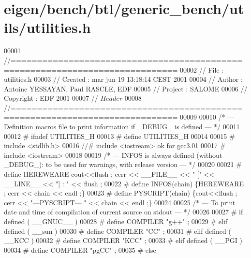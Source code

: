 \hypertarget{eigen_2bench_2btl_2generic__bench_2utils_2utilities_8h_source}{}\section{eigen/bench/btl/generic\+\_\+bench/utils/utilities.h}
\label{eigen_2bench_2btl_2generic__bench_2utils_2utilities_8h_source}

\begin{DoxyCode}
00001 \textcolor{comment}{//=============================================================================}
00002 \textcolor{comment}{// File      : utilities.h}
00003 \textcolor{comment}{// Created   : mar jun 19 13:18:14 CEST 2001}
00004 \textcolor{comment}{// Author    : Antoine YESSAYAN, Paul RASCLE, EDF}
00005 \textcolor{comment}{// Project   : SALOME}
00006 \textcolor{comment}{// Copyright : EDF 2001}
00007 \textcolor{comment}{// $Header$}
00008 \textcolor{comment}{//=============================================================================}
00009 
00010 \textcolor{comment}{/* ---  Definition macros file to print information if \_DEBUG\_ is defined --- */}
00011 
00012 \textcolor{preprocessor}{# ifndef UTILITIES\_H}
00013 \textcolor{preprocessor}{# define UTILITIES\_H}
00014 
00015 \textcolor{preprocessor}{# include <stdlib.h>}
00016 \textcolor{comment}{//# include <iostream> ok for gcc3.01}
00017 \textcolor{preprocessor}{# include <iostream>}
00018 
00019 \textcolor{comment}{/* ---  INFOS is always defined (without \_DEBUG\_): to be used for warnings, with release version --- */}
00020 
00021 \textcolor{preprocessor}{# define HEREWEARE cout<<flush ; cerr << \_\_FILE\_\_ << " [" << \_\_LINE\_\_ << "] : " << flush ;}
00022 \textcolor{preprocessor}{# define INFOS(chain) \{HEREWEARE ; cerr << chain << endl ;\}}
00023 \textcolor{preprocessor}{# define PYSCRIPT(chain) \{cout<<flush ; cerr << "---PYSCRIPT--- " << chain << endl ;\}}
00024 
00025 \textcolor{comment}{/* --- To print date and time of compilation of current source on stdout --- */}
00026 
00027 \textcolor{preprocessor}{# if defined ( \_\_GNUC\_\_ )}
00028 \textcolor{preprocessor}{# define COMPILER       "g++" ;}
00029 \textcolor{preprocessor}{# elif defined ( \_\_sun )}
00030 \textcolor{preprocessor}{# define COMPILER       "CC" ;}
00031 \textcolor{preprocessor}{# elif defined ( \_\_KCC )}
00032 \textcolor{preprocessor}{# define COMPILER       "KCC" ;}
00033 \textcolor{preprocessor}{# elif defined ( \_\_PGI )}
00034 \textcolor{preprocessor}{# define COMPILER       "pgCC" ;}
00035 \textcolor{preprocessor}{# else}

\end{DoxyCode}

